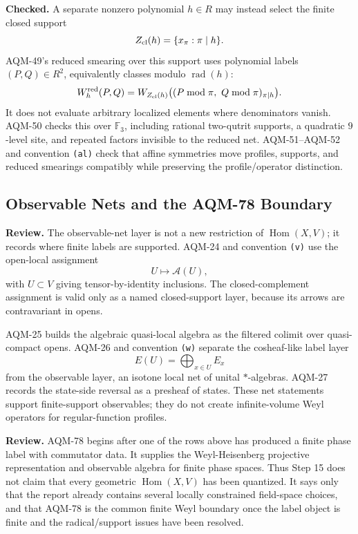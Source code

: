 \textbf{Checked.}  A separate nonzero polynomial \(h\in R\) may instead select the finite closed support
\[
  Z_{\rm cl}(h)=\{x_\pi:\pi\mid h\}.
\]
AQM-49's reduced smearing over this support uses polynomial labels
\((P,Q)\in R^2\), equivalently classes modulo \(\operatorname{rad}(h)\):
\[
  W_h^{\rm red}(P,Q)=
  W_{Z_{\rm cl}(h)}\bigl((P\bmod\pi,\ Q\bmod\pi)_{\pi\mid h}\bigr).
\]
It does not evaluate arbitrary localized elements where denominators vanish.
AQM-50 checks this over \(\mathbb F_3\), including rational two-qutrit
supports, a quadratic \(9\)-level site, and repeated factors invisible to the
reduced net.  AQM-51--AQM-52 and convention \texttt{(al)} check that affine
symmetries move profiles, supports, and reduced smearings compatibly while
preserving the profile/operator distinction.

\subsection{Observable Nets and the AQM-78 Boundary}

\textbf{Review.}  The observable-net layer is not a new restriction of
\(\operatorname{Hom}(X,V)\); it records where finite labels are supported.
AQM-24 and convention \texttt{(v)} use the open-local assignment
\[
  U\longmapsto\mathcal A(U),
\]
with \(U\subset V\) giving tensor-by-identity inclusions.  The
closed-complement assignment is valid only as a named closed-support layer,
because its arrows are contravariant in opens.

AQM-25 builds the algebraic quasi-local algebra as the filtered colimit over
quasi-compact opens.  AQM-26 and convention \texttt{(w)} separate the
cosheaf-like label layer
\[
  E(U)=\bigoplus_{x\in U}E_x
\]
from the observable layer, an isotone local net of unital \(*\)-algebras.
AQM-27 records the state-side reversal as a presheaf of states.  These net
statements support finite-support observables; they do not create
infinite-volume Weyl operators for regular-function profiles.

\textbf{Review.}  AQM-78 begins after one of the rows above has produced a
finite phase label with commutator data.  It supplies the Weyl-Heisenberg
projective representation and observable algebra for finite phase spaces.
Thus Step 15 does not claim that every geometric
\(\operatorname{Hom}(X,V)\) has been quantized.  It says only that the report
already contains several locally constrained field-space choices, and that
AQM-78 is the common finite Weyl boundary once the label object is finite and
the radical/support issues have been resolved.

